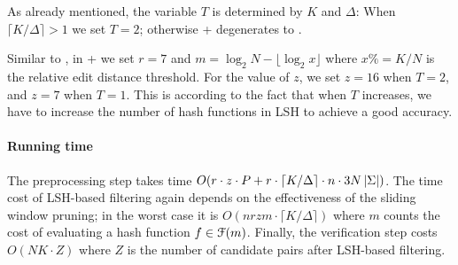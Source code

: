As already mentioned, the variable $T$ is determined by $K$ and $\Delta$: When $\lceil K/\Delta \rceil > 1$ we set $T = 2$; otherwise \ebdjoin+ degenerates to \ebdjoin.

Similar to \ebdjoin, in \ebdjoin+ we set $r = 7$ and $m = \log_2 N - \lfloor \log_2 x \rfloor$ where $x \% = K/N$ is the relative edit distance threshold.  For the value of $z$, we set $z = 16$ when $T = 2$, and $z = 7$ when $T = 1$.
This is according to the fact that when $T$ increases, we have to increase the number of hash functions in LSH to achieve a good accuracy. 

\paragraph{Running time}
The preprocessing step takes time $O(r \cdot z \cdot P + r \cdot \lceil K/\Delta \rceil \cdot n \cdot 3N \left| \Sigma \right|)$.  The time cost of LSH-based filtering again depends on the effectiveness of the sliding window pruning; in the worst case it is $O(n r z m \cdot \lceil K/\Delta \rceil)$ where $m$ counts the cost of evaluating a hash function $f \in \mathcal{F}(m)$. Finally, the verification step costs $O(N K \cdot Z)$ where $Z$ is the number of candidate pairs after LSH-based filtering.



